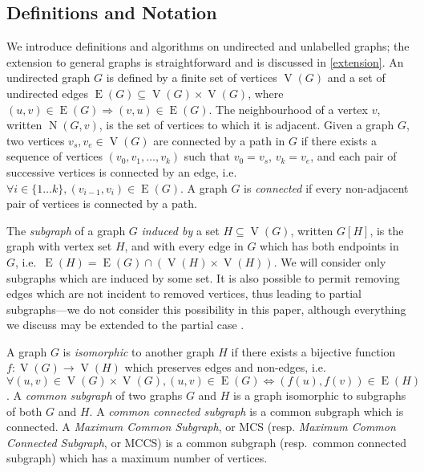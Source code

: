 \documentclass{llncs}
\begin{document}
\subsection{Definitions and Notation}

We introduce definitions and algorithms on undirected and unlabelled graphs; the
extension to general graphs is straightforward and is discussed in \cref{extension}. An undirected
graph $G$ is defined by a finite set of vertices $\operatorname{V}(G)$ and a set of undirected edges
$\operatorname{E}(G) \subseteq \operatorname{V}(G) \times \operatorname{V}(G)$, where $(u, v) \in
\operatorname{E}(G) \Rightarrow (v, u) \in \operatorname{E}(G)$. The neighbourhood of
a vertex $v$, written $\operatorname{N}(G, v)$, is the set of vertices to which it is adjacent.
Given a graph $G$, two vertices $v_s, v_e \in \operatorname{V}(G)$ are connected by a path in $G$ if
there exists a sequence of vertices $(v_0, v_1, \ldots, v_k)$ such that $v_0 = v_s$, $v_k = v_e$,
and each pair of successive vertices is connected by an edge, i.e.\ $\forall i\in \{1 \ldots k \},
(v_{i-1}, v_i) \in \operatorname{E}(G)$. A graph $G$ is \emph{connected} if every non-adjacent pair
of vertices is connected by a path.

The \emph{subgraph} of a graph $G$ \emph{induced by} a set $H \subseteq \operatorname{V}(G)$,
written $G[H]$, is the graph with vertex set $H$, and with every edge in $G$ which has both
endpoints in $G$, i.e.\ $\operatorname{E}(H) = \operatorname{E}(G) \cap (\operatorname{V}(H) \times
\operatorname{V}(H))$. We will consider only subgraphs which are induced by some set. It is also
possible to permit removing edges which are not incident to removed vertices, thus leading to
partial subgraphs---we do not consider this possibility in this paper, although everything we
discuss may be extended to the partial case \cite{DBLP:conf/cp/NdiayeS11}.

A graph $G$ is \emph{isomorphic} to another graph $H$ if there exists a bijective function $f :
\operatorname{V}(G) \rightarrow \operatorname{V}(H)$ which preserves edges and non-edges, i.e.\
$\forall (u, v) \in \operatorname{V}(G) \times \operatorname{V}(G), (u, v) \in \operatorname{E}(G)
\Leftrightarrow (f(u),f(v)) \in \operatorname{E}(H)$.  A \emph{common subgraph} of two graphs $G$
and $H$ is a graph isomorphic to subgraphs of both $G$ and $H$. A \emph{common connected subgraph} is a
common subgraph which is connected.  A \emph{Maximum Common Subgraph}, or MCS (resp. \emph{Maximum
Common Connected Subgraph}, or MCCS) is a common subgraph (resp.\ common connected subgraph) which has
a maximum number of vertices.
\end{document}
